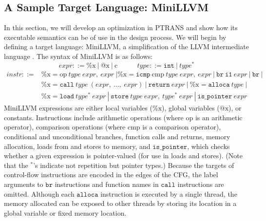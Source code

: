 \documentclass{eptcs}
\newcommand{\ignore}[1]{{}}
\newcommand{\ptrans}[0]{PTRANS}
\begin{document}
\subsection{A Sample Target Language: MiniLLVM}
\label{language}
In this section, we will develop an optimization in {\ptrans} and show how its executable semantics can be of use in the design process. We will begin by defining a target language: MiniLLVM, a simplification of the LLVM intermediate language \cite{llvm}. The syntax of MiniLLVM is as follows:
$$\mathit{expr} ::= \mathtt{\%}\mathrm{x}~|~\mathtt{@}\mathrm{x}~|~\mathrm{c} ~~~~~~~~~~~~~ \mathit{type} ::= \mathtt{int}~|~\mathit{type}^\mathtt{*}$$
\vspace{-.2in}
$$\begin{array}{rl}
\mathit{instr} ::=& \mathtt{\%}\mathrm{x} = \mathrm{op}\ \mathit{type}\ \mathit{expr}\mathtt{,}\ \mathit{expr}\ | \%\mathrm{x} = \mathtt{icmp}\ \mathrm{cmp}\ \mathit{type}\ \mathit{expr}\mathtt{,}\ \mathit{expr}\ |\ \mathtt{br}\ \mathtt{i1}\ \mathit{expr}~|~\mathtt{br}~|~\\&\%\mathrm{x} = \mathtt{call}\ \mathit{type}\ (\mathit{expr}\mathtt{,}\ ...\mathtt{,}\ \mathit{expr})~|~\mathtt{return}\ \mathit{expr}\ |\ \%\mathrm{x} = \mathtt{alloca}\ \mathit{type}~|~\\&\mathtt{\%}\mathrm{x} = \mathtt{load}\ \mathit{type}^\mathtt{*}\ \mathit{expr}~|~\mathtt{store}\ \mathit{type}\ \mathit{expr}\mathtt{,}\ \mathit{type}^\mathtt{*}\ \mathit{expr}~|~\mathtt{is\_pointer}\ \mathit{expr}\ignore{\mathtt{\%}\mathrm{x} = \mathtt{cmpxchg}\ \mathit{type}^\mathtt{*}\ \mathit{expr}\mathtt{,} \mathit{type}\ \mathit{expr}\mathtt{,} \mathit{type}\ \mathit{expr}~|~}
\end{array}$$
MiniLLVM expressions are either local variables ($\mathtt{\%}\mathrm{x}$), global variables ($\mathtt{@}\mathrm{x}$), or constants. Instructions include arithmetic operations (where op is an arithmetic operator), comparison operations (where cmp is a comparison operator), conditional and unconditional branches, function calls and returns, memory allocation, loads from and stores to memory, and $\mathtt{is\_pointer}$, which checks whether a given expression is pointer-valued (for use in loads and stores). (Note that the $^\mathtt{*}$'s indicate not repetition but pointer types.) Because the targets of control-flow instructions are encoded in the edges of the \ac{CFG}, the label arguments to $\mathtt{br}$ instructions and function names in $\mathtt{call}$ instructions are omitted. Although each $\mathtt{alloca}$ instruction is executed by a single thread, the memory allocated can be exposed to other threads by storing its location in a global variable or fixed memory location. 
\end{document}

